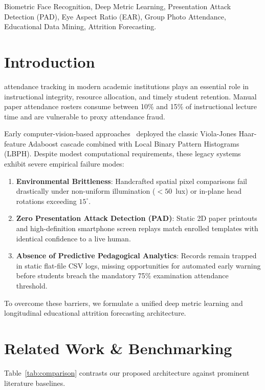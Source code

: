 \documentclass[journal,10pt,twocolumn]{IEEEtran}
\begin{document}
\begin{IEEEkeywords}
Biometric Face Recognition, Deep Metric Learning, Presentation Attack Detection (PAD), Eye Aspect Ratio (EAR), Group Photo Attendance, Educational Data Mining, Attrition Forecasting.
\end{IEEEkeywords}

\section{Introduction}
 attendance tracking in modern academic institutions plays an essential role in instructional integrity, resource allocation, and timely student retention. Manual paper attendance rosters consume between 10\% and 15\% of instructional lecture time and are vulnerable to proxy attendance fraud.

Early computer-vision-based approaches~\cite{patil2020smart, arsenovic2019automated} deployed the classic Viola-Jones Haar-feature Adaboost cascade combined with Local Binary Pattern Histograms (LBPH). Despite modest computational requirements, these legacy systems exhibit severe empirical failure modes:
\begin{enumerate}
    \item \textbf{Environmental Brittleness}: Handcrafted spatial pixel comparisons fail drastically under non-uniform illumination ($<50$~lux) or in-plane head rotations exceeding $15^\circ$.
    \item \textbf{Zero Presentation Attack Detection (PAD)}: Static 2D paper printouts and high-definition smartphone screen replays match enrolled templates with identical confidence to a live human.
    \item \textbf{Absence of Predictive Pedagogical Analytics}: Records remain trapped in static flat-file CSV logs, missing opportunities for automated early warning before students breach the mandatory 75\% examination attendance threshold.
\end{enumerate}

To overcome these barriers, we formulate a unified deep metric learning and longitudinal educational attrition forecasting architecture.

\section{Related Work \& Benchmarking}
Table~\ref{tab:comparison} contrasts our proposed architecture against prominent literature baselines.
\end{document}

